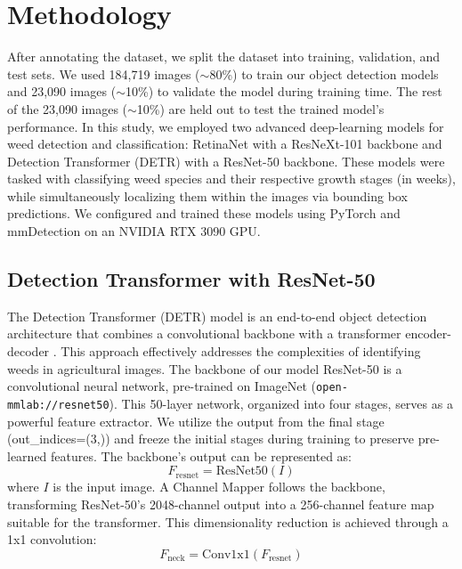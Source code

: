 \section{Methodology}

After annotating the dataset, we split the dataset into training, validation, and test sets. We used 184,719 images ($\sim$80\%) to train our object detection models and 23,090 images ($\sim$10\%) to validate the model during training time. The rest of the 23,090 images ($\sim$10\%) are held out to test the trained model’s performance. In this study, we employed two advanced deep-learning models for weed detection and classification: RetinaNet with a ResNeXt-101 backbone and Detection Transformer (DETR) with a ResNet-50 backbone. These models were tasked with classifying weed species and their respective growth stages (in weeks), while simultaneously localizing them within the images via bounding box predictions. We configured and trained these models using PyTorch and mmDetection on an NVIDIA RTX 3090 GPU.

\subsection{Detection Transformer with ResNet-50}

The Detection Transformer (DETR) model is an end-to-end object detection architecture that combines a convolutional backbone with a transformer encoder-decoder \cite{carion2020end}. This approach effectively addresses the complexities of identifying weeds in agricultural images. The backbone of our model ResNet-50 is a convolutional neural network, pre-trained on ImageNet (\texttt{open-mmlab://resnet50}). This 50-layer network, organized into four stages, serves as a powerful feature extractor. We utilize the output from the final stage (out\_indices=(3,)) and freeze the initial stages during training to preserve pre-learned features. The backbone's output can be represented as:
\vspace{-0.2cm}
\begin{equation}
F_{\text{resnet}} = \text{ResNet50}(I)
\end{equation}
where \(I\) is the input image. A Channel Mapper follows the backbone, transforming ResNet-50's 2048-channel output into a 256-channel feature map suitable for the transformer. This dimensionality reduction is achieved through a 1x1 convolution:
\vspace{-0.2cm}
\begin{equation}
F_{\text{neck}} = \text{Conv1x1}(F_{\text{resnet}})
\end{equation}

